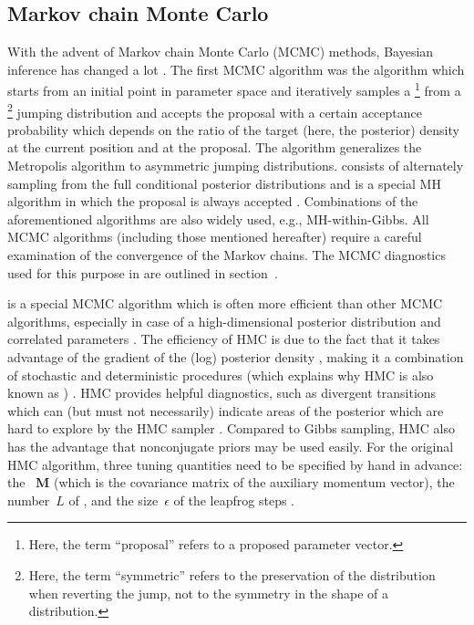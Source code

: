 \subsection{Markov chain Monte Carlo}
\label{algos-mcmc}

With the advent of Markov chain Monte Carlo (MCMC) methods, Bayesian inference
has changed a lot \citep{woodward_bugsxla_2005, lunn_bugs_2009}. The first
MCMC algorithm was the  algorithm
\citep{metropolis_equation_1953} which starts from an initial point in
parameter space and iteratively samples a \footnote{Here,
the term ``proposal'' refers to a proposed parameter vector.} from a
\footnote{Here, the term ``symmetric'' refers to the preservation
of the distribution when reverting the jump, not to the symmetry in the shape of
a distribution.} jumping distribution and accepts the proposal with a certain
acceptance probability which depends on the ratio of the target (here, the
posterior) density at the current position and at the proposal. The
 algorithm \citep{metropolis_equation_1953,
hastings_monte_1970} generalizes the Metropolis algorithm to asymmetric
jumping distributions.  \citep{geman_stochastic_1984,
gelfand_sampling-based_1990} consists of alternately sampling from the full
conditional posterior distributions and is a special MH algorithm in which the
proposal is always accepted \citep{gelman_bayesian_2014}. Combinations of
the aforementioned algorithms are also widely used, e.g., MH-within-Gibbs.
All MCMC algorithms (including those mentioned hereafter) require a careful
examination of the convergence of the Markov chains. The MCMC diagnostics used
for this purpose in  are outlined in section~.

\citep[initial work and major contributions by][]{duane_hybrid_1987,
neal_probabilistic_1993, mackay_information_2003, neal_mcmc_2011} is a special
MCMC algorithm which is
often more efficient than other MCMC algorithms, especially in case of a
high-dimensional posterior distribution and correlated parameters
\citep{hoffman_no-u-turn_2014, betancourt_conceptual_2018}. The efficiency
of HMC is due to the fact that it takes advantage of the gradient of the (log)
posterior density \citep{stan_development_team_reference_2022}, making it a
combination of stochastic and deterministic procedures (which explains why HMC
is also known as )
\citep{gelman_bayesian_2014}. HMC provides helpful diagnostics, such
as divergent transitions which can (but must not necessarily) indicate areas
of the posterior which are hard to explore by the HMC sampler
\citep{betancourt_conceptual_2018, gabry_visualization_2019}. Compared to
Gibbs sampling, HMC also has the advantage that nonconjugate priors may be
used easily. For the original HMC algorithm, three tuning quantities need to
be specified by hand in advance: the ~$\boldsymbol{M}$ (which
is the covariance matrix of the auxiliary momentum vector), the number~$L$ of
, and the size~$\epsilon$ of the leapfrog steps
\citep{gelman_bayesian_2014, stan_development_team_reference_2022}.

